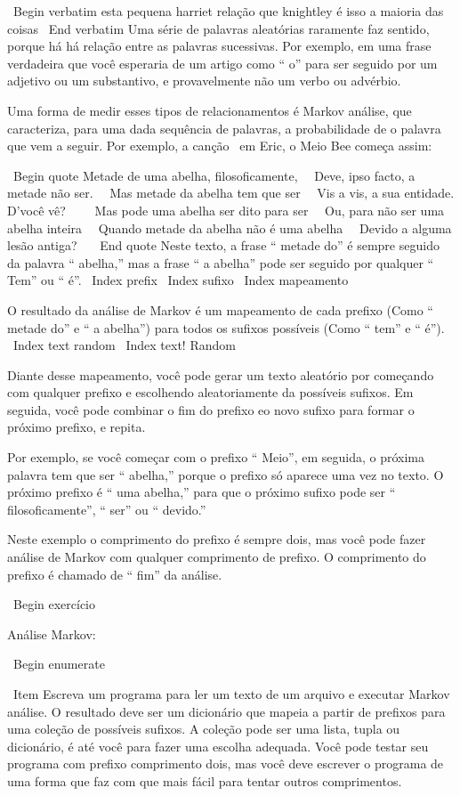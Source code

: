 \documentclass[10pt]{book}
\begin{document}
\begin {itemize}
{{{{{{{{{\ Begin {verbatim}
esta pequena harriet relação que knightley é isso a maioria das coisas
\ End {verbatim}
%
Uma série de palavras aleatórias raramente faz sentido, porque há
há relação entre as palavras sucessivas. Por exemplo, em
uma frase verdadeira que você esperaria de um artigo como `` o'' para
ser seguido por um adjetivo ou um substantivo, e provavelmente não um verbo
ou advérbio.

Uma forma de medir esses tipos de relacionamentos é Markov
análise, que
caracteriza, para uma dada sequência de palavras, a probabilidade de o
palavra que vem a seguir. Por exemplo, a canção {\ em Eric, o Meio
  Bee} começa assim:

\ Begin {quote}
Metade de uma abelha, filosoficamente, \ \
Deve, ipso facto, a metade não ser. \ \
Mas metade da abelha tem que ser \ \
Vis a vis, a sua entidade. D'você vê? \ \
\ \
Mas pode uma abelha ser dito para ser \ \
Ou, para não ser uma abelha inteira \ \
Quando metade da abelha não é uma abelha \ \
Devido a alguma lesão antiga? \ \
\ End {quote}
%
Neste texto,
a frase `` metade do'' é sempre seguido da palavra `` abelha,''
mas a frase `` a abelha'' pode ser seguido por qualquer
`` Tem'' ou `` é''.
\ Index {prefix}
\ Index {sufixo}
\ Index {mapeamento}

O resultado da análise de Markov é um mapeamento de cada prefixo
(Como `` metade do'' e `` a abelha'') para todos os sufixos possíveis
(Como `` tem'' e `` é'').
\ Index {text random}
\ Index {text! Random}

Diante desse mapeamento, você pode gerar um texto aleatório por
começando com qualquer prefixo e escolhendo aleatoriamente da
possíveis sufixos. Em seguida, você pode combinar o fim do
prefixo eo novo sufixo para formar o próximo prefixo, e repita.

Por exemplo, se você começar com o prefixo `` Meio'', em seguida, o
próxima palavra tem que ser `` abelha,'' porque o prefixo só aparece
uma vez no texto. O próximo prefixo é `` uma abelha,'' para que o
próximo sufixo pode ser `` filosoficamente'', `` ser'' ou `` devido.''

Neste exemplo o comprimento do prefixo é sempre dois, mas
você pode fazer análise de Markov com qualquer comprimento de prefixo. O comprimento
do prefixo é chamado de `` fim'' da análise.

\ Begin {} exercício

Análise Markov:

\ Begin {enumerate}

\ Item Escreva um programa para ler um texto de um arquivo e executar Markov
análise. O resultado deve ser um dicionário que mapeia a partir de
prefixos para uma coleção de possíveis sufixos. A coleção
pode ser uma lista, tupla ou dicionário, é até você para fazer
uma escolha adequada. Você pode testar seu programa com prefixo
comprimento dois, mas você deve escrever o programa de uma forma que faz com que
mais fácil para tentar outros comprimentos.

}}}}}}}}}
\end{itemize}
\end{document}
